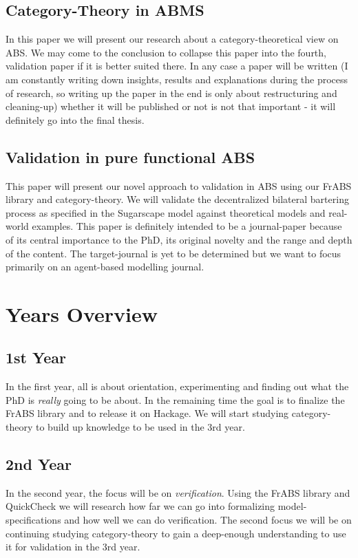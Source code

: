 \subsection{Category-Theory in ABMS}
In this paper we will present our research about a category-theoretical view on ABS. 
We may come to the conclusion to collapse this paper into the fourth, validation paper if it is better suited there. In any case a paper will be written (I am constantly writing down insights, results and explanations during the process of research, so writing up the paper in the end is only about restructuring and cleaning-up) whether it will be published or not is not that important - it will definitely go into the final thesis.

\subsection{Validation in pure functional ABS}
This paper will present our novel approach to validation in ABS using our FrABS library and category-theory. We will validate the decentralized bilateral bartering process as specified in the Sugarscape model against theoretical models and real-world examples. This paper is definitely intended to be a journal-paper because of its central importance to the PhD, its original novelty and the range and depth of the content. The target-journal is yet to be determined but we want to focus primarily on an agent-based modelling journal.

\section{Years Overview}

\subsection{1st Year}
In the first year, all is about orientation, experimenting and finding out what the PhD is \textit{really} going to be about. In the remaining time the goal is to finalize the FrABS library and to release it on Hackage. We will start studying category-theory to build up knowledge to be used in the 3rd year.

\subsection{2nd Year}
In the second year, the focus will be on \textit{verification}. Using the FrABS library and QuickCheck we will research how far we can go into formalizing model-specifications and how well we can do verification. The second focus we will be on continuing studying category-theory to gain a deep-enough understanding to use it for validation in the 3rd year.

